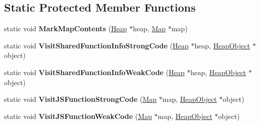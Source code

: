 \subsection*{Static Protected Member Functions}
\begin{DoxyCompactItemize}
\item 
static void {\bfseries Mark\+Map\+Contents} (\hyperlink{classv8_1_1internal_1_1_heap}{Heap} $\ast$heap, \hyperlink{classv8_1_1internal_1_1_map}{Map} $\ast$map)\hypertarget{classv8_1_1internal_1_1_static_marking_visitor_a969e460ed450d63ae48bbd5c98fef110}{}\label{classv8_1_1internal_1_1_static_marking_visitor_a969e460ed450d63ae48bbd5c98fef110}

\item 
static void {\bfseries Visit\+Shared\+Function\+Info\+Strong\+Code} (\hyperlink{classv8_1_1internal_1_1_heap}{Heap} $\ast$heap, \hyperlink{classv8_1_1internal_1_1_heap_object}{Heap\+Object} $\ast$object)\hypertarget{classv8_1_1internal_1_1_static_marking_visitor_a55a54e83dc7ddd5d5c852065d0feaa3c}{}\label{classv8_1_1internal_1_1_static_marking_visitor_a55a54e83dc7ddd5d5c852065d0feaa3c}

\item 
static void {\bfseries Visit\+Shared\+Function\+Info\+Weak\+Code} (\hyperlink{classv8_1_1internal_1_1_heap}{Heap} $\ast$heap, \hyperlink{classv8_1_1internal_1_1_heap_object}{Heap\+Object} $\ast$object)\hypertarget{classv8_1_1internal_1_1_static_marking_visitor_ae100f2c20c25f335211b7a7ed6aae333}{}\label{classv8_1_1internal_1_1_static_marking_visitor_ae100f2c20c25f335211b7a7ed6aae333}

\item 
static void {\bfseries Visit\+J\+S\+Function\+Strong\+Code} (\hyperlink{classv8_1_1internal_1_1_map}{Map} $\ast$map, \hyperlink{classv8_1_1internal_1_1_heap_object}{Heap\+Object} $\ast$object)\hypertarget{classv8_1_1internal_1_1_static_marking_visitor_a24d0c2c61c66a7b098a10e8c7b69871c}{}\label{classv8_1_1internal_1_1_static_marking_visitor_a24d0c2c61c66a7b098a10e8c7b69871c}

\item 
static void {\bfseries Visit\+J\+S\+Function\+Weak\+Code} (\hyperlink{classv8_1_1internal_1_1_map}{Map} $\ast$map, \hyperlink{classv8_1_1internal_1_1_heap_object}{Heap\+Object} $\ast$object)\hypertarget{classv8_1_1internal_1_1_static_marking_visitor_a4cecb783fbac7ca1b321a7189852563f}{}\label{classv8_1_1internal_1_1_static_marking_visitor_a4cecb783fbac7ca1b321a7189852563f}

\end{DoxyCompactItemize}
